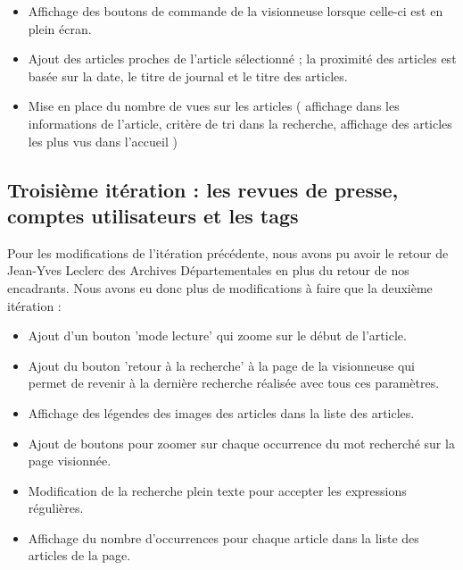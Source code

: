 \begin{itemize}
	\item Affichage des boutons de commande de la visionneuse lorsque celle-ci est en plein écran.

	\item Ajout des articles proches de l'article sélectionné ; la proximité des articles est basée sur la date, le titre de journal et le titre des articles.

	\item Mise en place du nombre de vues sur les articles ( affichage dans les informations de l'article, critère de tri dans la recherche, affichage des articles les plus vus dans l'accueil )

\end{itemize}

\subsection{Troisième itération : les revues de presse, comptes utilisateurs et les tags}

Pour les modifications de l'itération précédente, nous avons pu avoir le retour de Jean-Yves Leclerc des Archives Départementales en plus du retour de nos encadrants. Nous avons eu donc plus de modifications à faire que la deuxième itération : 

\begin{itemize}
\setlength\itemsep{1em}

	\item Ajout d'un bouton 'mode lecture' qui zoome sur le début de l'article.

	\item Ajout du bouton 'retour à la recherche' à la page de la visionneuse qui permet de revenir à la dernière recherche réalisée avec tous ces paramètres.

	\item Affichage des légendes des images des articles dans la liste des articles.

	\item Ajout de boutons pour zoomer sur chaque occurrence du mot recherché sur la page visionnée.

	\item Modification de la recherche plein texte pour accepter les expressions régulières.

	\item Affichage du nombre d'occurrences pour chaque article dans la liste des articles de la page.

\end{itemize}

